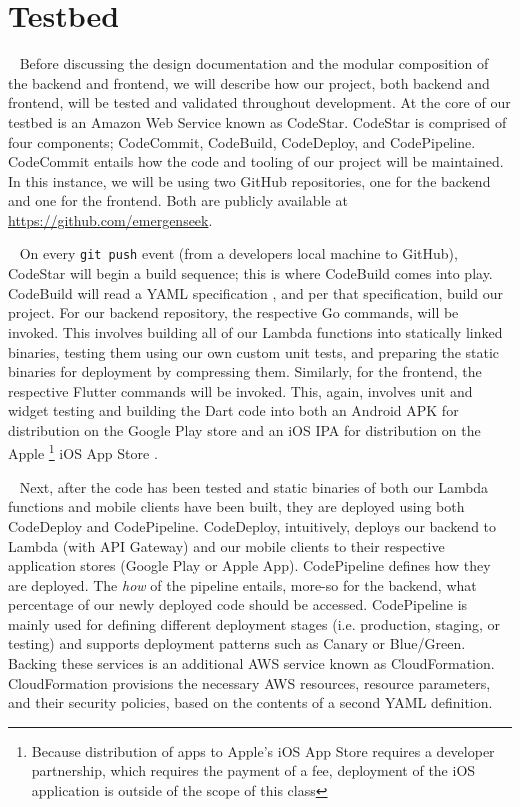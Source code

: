 \documentclass[10pt, a4paper]{article}
\begin{document}
\section{Testbed}
\par ~ Before discussing the design documentation and the modular composition of the backend and frontend, we will describe how our project, both backend and frontend, will be tested and validated throughout development. At the core of our testbed is an Amazon Web Service known as CodeStar. CodeStar is comprised of four components; CodeCommit, CodeBuild, CodeDeploy, and CodePipeline. CodeCommit entails how the code and tooling of our project will be maintained. In this instance, we will be using two GitHub repositories, one for the backend and one for the frontend. Both are publicly available at \url{https://github.com/emergenseek}. 

\par ~ On every \texttt{git push} event (from a developers local machine to GitHub), CodeStar will begin a build sequence; this is where CodeBuild comes into play. CodeBuild will read a YAML specification \cite{two}, and per that specification, build our project. For our backend repository, the respective Go commands, will be invoked. This involves building all of our Lambda functions into statically linked binaries, testing them using our own custom unit tests, and preparing the static binaries for deployment by compressing them. Similarly, for the frontend, the respective Flutter commands will be invoked. This, again, involves unit and widget testing \cite{three} and building the Dart code into both an Android APK \cite{four} for distribution on the Google Play store and an iOS IPA for distribution on the Apple \footnote{Because distribution of apps to Apple's iOS App Store requires a developer partnership, which requires the payment of a fee, deployment of the iOS application is outside of the scope of this class} iOS App Store .

\par ~ Next, after the code has been tested and static binaries of both our Lambda functions and mobile clients have been built, they are deployed using both CodeDeploy and CodePipeline. CodeDeploy, intuitively, deploys our backend to Lambda (with API Gateway) and our mobile clients to their respective application stores (Google Play or Apple App). CodePipeline defines how they are deployed. The \emph{how} of the pipeline entails, more-so for the backend, what percentage of our newly deployed code should be accessed. CodePipeline is mainly used for defining different deployment stages (i.e. production, staging, or testing) and supports deployment patterns such as Canary or Blue/Green. Backing these services is an additional AWS service known as CloudFormation. CloudFormation provisions the necessary AWS resources, resource parameters, and their security policies, based on the contents of a second YAML definition.
\end{document}
